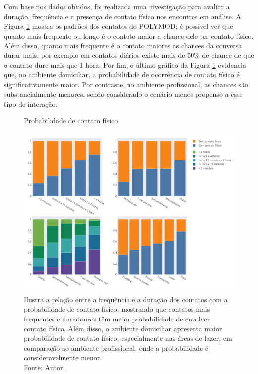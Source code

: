 Com base nos dados obtidos, 
foi
realizada uma investigação para avaliar a duração, frequência e a presença de contato físico nos encontros em análise. A Figura \ref{fig:graficos} mostra os padrões dos contatos do POLYMOD; é possível ver que quanto mais frequente ou  
longo
é o contato maior a chance dele ter contato físico.
Além disso, quanto mais frequente é o contato maiores as chances da conversa durar mais, por exemplo em contatos diários existe mais de 50\% de chance de que o contato dure mais que 1 hora. Por fim, 
o último gráfico da Figura \ref{fig:graficos}
evidencia que, no ambiente domiciliar, a probabilidade de ocorrência de contato físico é significativamente maior.
Por contraste, no ambiente profissional, as chances são substancialmente menores, sendo considerado o cenário menos propenso a esse tipo de interação.

\begin{figure}[H]
    \centering
    \captionsetup{font=normalsize,skip=0.8pt,singlelinecheck=on,labelsep=endash}
    \caption{Probabilidade de contato físico}
    \includegraphics[scale= 0.45]{figuras/graficos-PIF.png}
\captionsetup{font=small,justification=justified}
    \caption*{Ilustra a relação entre a frequência e a duração dos contatos com a probabilidade de contato físico, mostrando que contatos mais frequentes e duradouros têm maior probabilidade de envolver contato físico. Além disso, o ambiente domiciliar apresenta maior probabilidade de contato físico, especialmente nas áreas de lazer, em comparação ao ambiente profissional, onde a probabilidade é consideravelmente menor.\\ Fonte: Autor.}
    \label{fig:graficos}
\end{figure}

